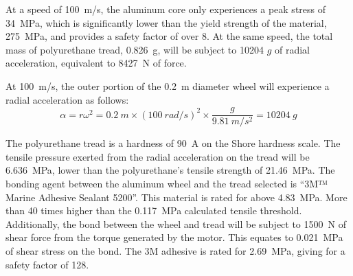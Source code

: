 \documentclass[main.tex]{subfiles}
\begin{document}
    At a speed of \SI{100}{m/s}, the aluminum core only experiences a peak stress of \SI{34}{MPa}, which is significantly lower than the yield strength of the material, \SI{275}{MPa}, and provides a safety factor of over 8. At the same speed, the total mass of polyurethane tread, \SI{0.826}{g}, will be subject to 10204 $g$ of radial acceleration, equivalent to \SI{8427}{N} of force.\\

    \begin{center}
    At \SI{100}{m/s}, the outer portion of the \SI{0.2}{m} diameter wheel will experience a radial acceleration as follows:
    	\[
  		\alpha=r\omega^2=\SI{0.2}{m}\times (\SI{100}{rad/s})^2 \times \frac{g}{\SI{9.81}{m/s^2}}= 10204\ g
   		\]
    \end{center}

    The polyurethane tread is a hardness of \SI{90}{A} on the Shore hardness scale. The tensile pressure exerted from the radial acceleration on the tread will be \SI{6.636}{MPa}, lower than the polyurethane's tensile strength of \SI{21.46}{MPa}. The bonding agent between the aluminum wheel and the tread selected is ``3M™ Marine Adhesive Sealant 5200''. This material is rated for above \SI{4.83}{MPa}. More than 40 times higher than the \SI{0.117}{MPa} calculated tensile threshold. Additionally, the bond between the wheel and tread will be subject to \SI{1500}{N} of shear force from the torque generated by the motor. This equates to \SI{0.021}{MPa} of shear stress on the bond. The 3M adhesive is rated for \SI{2.69}{MPa}, giving for a safety factor of 128. \\
\end{document}
